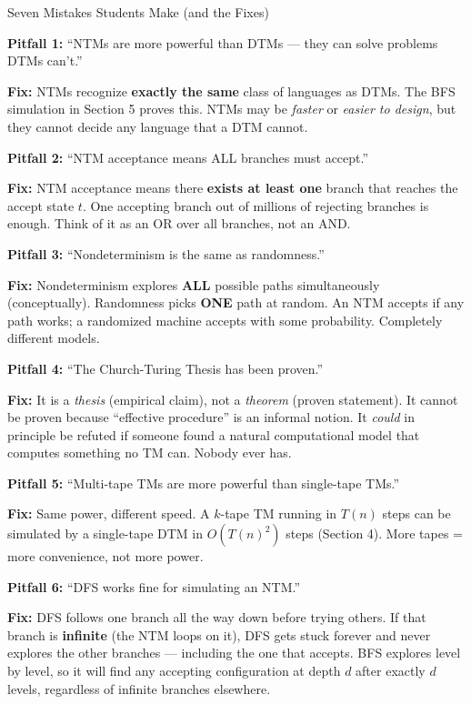 \begin{notebox}{Seven Mistakes Students Make (and the Fixes)}

\textbf{Pitfall 1:} ``NTMs are more powerful than DTMs --- they can solve problems DTMs can't.''

\textbf{Fix:} NTMs recognize \textbf{exactly the same} class of languages as DTMs. The BFS simulation in Section 5 proves this. NTMs may be \emph{faster} or \emph{easier to design}, but they cannot decide any language that a DTM cannot.

\medskip

\textbf{Pitfall 2:} ``NTM acceptance means ALL branches must accept.''

\textbf{Fix:} NTM acceptance means there \textbf{exists at least one} branch that reaches the accept state $t$. One accepting branch out of millions of rejecting branches is enough. Think of it as an OR over all branches, not an AND.

\medskip

\textbf{Pitfall 3:} ``Nondeterminism is the same as randomness.''

\textbf{Fix:} Nondeterminism explores \textbf{ALL} possible paths simultaneously (conceptually). Randomness picks \textbf{ONE} path at random. An NTM accepts if any path works; a randomized machine accepts with some probability. Completely different models.

\medskip

\textbf{Pitfall 4:} ``The Church-Turing Thesis has been proven.''

\textbf{Fix:} It is a \emph{thesis} (empirical claim), not a \emph{theorem} (proven statement). It cannot be proven because ``effective procedure'' is an informal notion. It \emph{could} in principle be refuted if someone found a natural computational model that computes something no TM can. Nobody ever has.

\medskip

\textbf{Pitfall 5:} ``Multi-tape TMs are more powerful than single-tape TMs.''

\textbf{Fix:} Same power, different speed. A $k$-tape TM running in $T(n)$ steps can be simulated by a single-tape DTM in $O(T(n)^2)$ steps (Section 4). More tapes = more convenience, not more power.

\medskip

\textbf{Pitfall 6:} ``DFS works fine for simulating an NTM.''

\textbf{Fix:} DFS follows one branch all the way down before trying others. If that branch is \textbf{infinite} (the NTM loops on it), DFS gets stuck forever and never explores the other branches --- including the one that accepts. BFS explores level by level, so it will find any accepting configuration at depth $d$ after exactly $d$ levels, regardless of infinite branches elsewhere.


\end{notebox}
